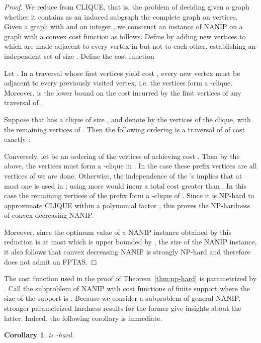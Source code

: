 \documentclass[english]{llncs}
\newtheorem{cor}[thm]{Corollary}
\begin{document}
\begin{proof} 

We reduce from CLIQUE, that is, the problem of deciding given a graph  whether it contains as an induced subgraph the complete graph on 
vertices.  Given a graph  with  and an integer , we
construct an instance of NANIP on a graph  with a convex cost function
 as follows.  Define  by adding  new vertices  to
 which are made adjacent to every vertex in  but not to each other, establishing
an independent set of size .
Define the cost function 




Let .  In a traversal  whose
first  vertices yield cost , every new vertex must be adjacent to every
previously visited vertex, i.e. the vertices form a -clique.  Moreover, 
is the lower bound on the cost incurred by the first  vertices of any
traversal of . 

Suppose that  has a clique of size , and denote by  the
vertices of the clique, with  the remaining vertices of
. Then the following ordering is a traversal of  of cost exactly :


Conversely, let  be an ordering of the vertices of 
achieving cost .  Then by the above, the vertices  must
form a -clique in .  In the case these  prefix vertices are all
vertices of  we are done.  Otherwise, the independence of the 's
implies that at most one  is used in ; using more
would incur a total cost greater than .  In this case the  remaining
vertices of the prefix form a -clique of .
Since it is NP-hard to approximate CLIQUE within a polynomial factor
\cite{Zuckerman06}, this proves the NP-hardness of convex decreasing NANIP.

Moreover, since the optimum value of a NANIP instance obtained by this reduction
is at most  which is upper bounded by , the size of the NANIP instance,
it also follows that convex decreasing NANIP is strongly NP-hard and therefore
does not admit an FPTAS. 

\end{proof}

The cost function  used in the proof of Theorem~\ref{thm:np-hard} is
parametrized by .  Call  the subproblem of NANIP with cost
functions of finite support where the size of the support is . Because we
consider  a subproblem of general NANIP, stronger
parametrized hardness results for the former give insights about the latter.
Indeed, the following corollary is immediate.

\begin{cor}
 is -hard.
\end{cor}
\end{document}
